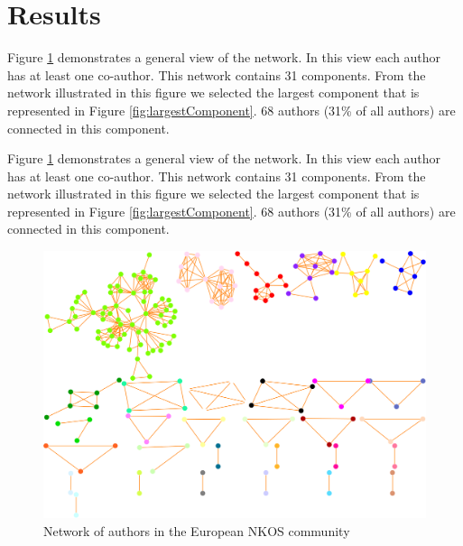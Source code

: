 \documentclass[runningheads,a4paper]{llncs}
\begin{document}
\section{Results}\label{results}

Figure \ref{fig:wholenet} demonstrates a general view of the network. In this view each author has at least one co-author. This network contains 31 components. From the network illustrated in this figure we selected the largest component that is represented in Figure \ref{fig:largestComponent}. 68 authors (31\% of all authors) are connected in this component. 

Figure \ref{fig:wholenet} demonstrates a general view of the network. In this view each author has at least one co-author. This network contains 31 components. From the network illustrated in this figure we selected the largest component that is represented in Figure \ref{fig:largestComponent}. 68 authors (31\% of all authors) are connected in this component. 


\begin{figure}
	\centering
	\includegraphics[width=1.0\linewidth]{wholeNet}
	\vspace{-0.5em}
	\caption{Network of authors in the European NKOS community}
	\label{fig:wholenet}
	\vspace{-0.5em}
\end{figure}

\end{document}
